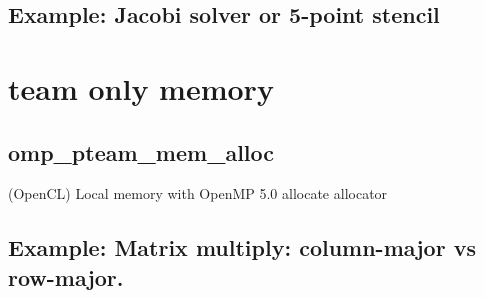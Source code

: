 \subsection{Example: Jacobi solver or 5-point stencil}

\section{team only memory}
\subsection{omp\_pteam\_mem\_alloc}
(OpenCL) Local memory with OpenMP 5.0 allocate allocator
\subsection{Example: Matrix multiply: column-major vs row-major.}

